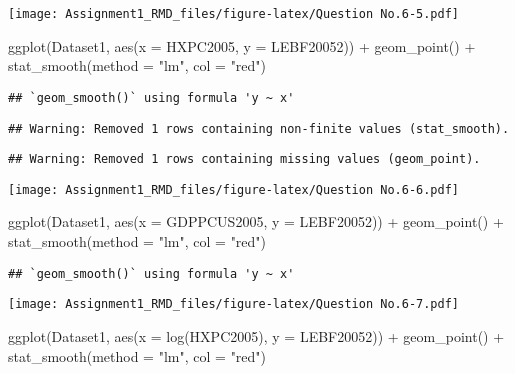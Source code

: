 \documentclass[
]{article}
\newenvironment{Shaded}{\begin{snugshade}}{\end{snugshade}}
\newcommand{\AttributeTok}[1]{\textcolor[rgb]{0.77,0.63,0.00}{#1}}
\newcommand{\FunctionTok}[1]{\textcolor[rgb]{0.00,0.00,0.00}{#1}}
\newcommand{\NormalTok}[1]{#1}
\newcommand{\SpecialCharTok}[1]{\textcolor[rgb]{0.00,0.00,0.00}{#1}}
\newcommand{\StringTok}[1]{\textcolor[rgb]{0.31,0.60,0.02}{#1}}
\begin{document}
\texttt{[image: Assignment1\_RMD\_files/figure-latex/Question No.6-5.pdf]}

\begin{Shaded}
\begin{Highlighting}[]
\FunctionTok{ggplot}\NormalTok{(Dataset1, }\FunctionTok{aes}\NormalTok{(}\AttributeTok{x =}\NormalTok{ HXPC2005, }\AttributeTok{y =}\NormalTok{ LEBF20052)) }\SpecialCharTok{+} 
  \FunctionTok{geom\_point}\NormalTok{() }\SpecialCharTok{+}
  \FunctionTok{stat\_smooth}\NormalTok{(}\AttributeTok{method =} \StringTok{"lm"}\NormalTok{, }\AttributeTok{col =} \StringTok{"red"}\NormalTok{)}
\end{Highlighting}
\end{Shaded}

\begin{verbatim}
## `geom_smooth()` using formula 'y ~ x'
\end{verbatim}

\begin{verbatim}
## Warning: Removed 1 rows containing non-finite values (stat_smooth).
\end{verbatim}

\begin{verbatim}
## Warning: Removed 1 rows containing missing values (geom_point).
\end{verbatim}

\texttt{[image: Assignment1\_RMD\_files/figure-latex/Question No.6-6.pdf]}

\begin{Shaded}
\begin{Highlighting}[]
\FunctionTok{ggplot}\NormalTok{(Dataset1, }\FunctionTok{aes}\NormalTok{(}\AttributeTok{x =}\NormalTok{ GDPPCUS2005, }\AttributeTok{y =}\NormalTok{ LEBF20052)) }\SpecialCharTok{+} 
  \FunctionTok{geom\_point}\NormalTok{() }\SpecialCharTok{+}
  \FunctionTok{stat\_smooth}\NormalTok{(}\AttributeTok{method =} \StringTok{"lm"}\NormalTok{, }\AttributeTok{col =} \StringTok{"red"}\NormalTok{)}
\end{Highlighting}
\end{Shaded}

\begin{verbatim}
## `geom_smooth()` using formula 'y ~ x'
\end{verbatim}

\texttt{[image: Assignment1\_RMD\_files/figure-latex/Question No.6-7.pdf]}

\begin{Shaded}
\begin{Highlighting}[]
\FunctionTok{ggplot}\NormalTok{(Dataset1, }\FunctionTok{aes}\NormalTok{(}\AttributeTok{x =} \FunctionTok{log}\NormalTok{(HXPC2005), }\AttributeTok{y =}\NormalTok{ LEBF20052)) }\SpecialCharTok{+} 
  \FunctionTok{geom\_point}\NormalTok{() }\SpecialCharTok{+}
  \FunctionTok{stat\_smooth}\NormalTok{(}\AttributeTok{method =} \StringTok{"lm"}\NormalTok{, }\AttributeTok{col =} \StringTok{"red"}\NormalTok{)}
\end{Highlighting}
\end{Shaded}
\end{document}
